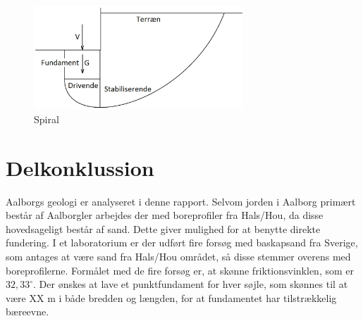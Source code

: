 \begin{figure}[htbp]
	\centering
	\includegraphics[width=0.7\textwidth]{billeder/spiral.png}
	\caption{Spiral}
	\label{fig:haha}
\end{figure}

\section{Delkonklussion}
Aalborgs geologi er analyseret i denne rapport. Selvom jorden i Aalborg primært består af Aalborgler arbejdes der med boreprofiler fra Hals/Hou, da disse hovedsageligt består af sand. Dette giver mulighed for at benytte direkte fundering. I et laboratorium er der udført fire forsøg med baskapsand fra Sverige, som antages at være sand fra Hals/Hou området, så disse stemmer overens med boreprofilerne. Formålet med de fire forsøg er, at skønne friktionsvinklen, som er $32,\!33^{\circ}$. Der ønskes at lave et punktfundament for hver søjle, som skønnes til at være XX m i både bredden og længden, for at fundamentet har tilstrækkelig bæreevne.